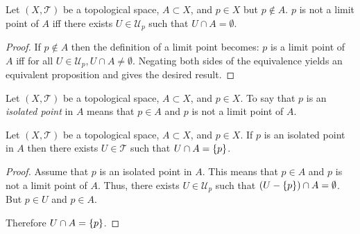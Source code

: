 \documentclass[letterpaper,12pt,fleqn]{article}
\newcommand{\T}{\mathscr{T}}
\newcommand{\U}{\mathcal{U}}
\begin{document}
\begin{theorem}
  Let \((X,\T)\) be a topological space, \(A\subset X\), and \(p\in X\) but \(p\notin A\).  \(p\) is not a limit
  point of \(A\) iff there exists \(U\in\U_p\) such that \(U\cap A=\emptyset\).
\end{theorem}

\begin{proof}
  If \(p\notin A\) then the definition of a limit point becomes: \(p\) is a limit point of \(A\) iff for all
  \(U\in\U_p,U\cap A\ne\emptyset\).  Negating both sides of the equivalence yields an equivalent proposition and
  gives the desired result.
\end{proof}

\begin{definition}
  Let \((X,\T)\) be a topological space, \(A\subset X\), and \(p\in X\).  To say that \(p\) is an \emph{isolated
    point} in \(A\) means that \(p\in A\) and \(p\) is not a limit point of \(A\).
\end{definition}

\begin{theorem}
  Let \((X,\T)\) be a topological space, \(A\subset X\), and \(p\in X\).  If \(p\) is an isolated point in \(A\)
  then there exists \(U\in\T\) such that \(U\cap A=\{p\}\).
\end{theorem}

\begin{proof}
  Assume that \(p\) is an isolated point in \(A\).  This means that \(p\in A\) and \(p\) is not a limit point of
  \(A\).  Thus, there exists \(U\in\U_p\) such that \((U-\{p\})\cap A=\emptyset\).  But \(p\in U\) and \(p\in A\).

  Therefore \(U\cap A=\{p\}\).
\end{proof}
\end{document}
